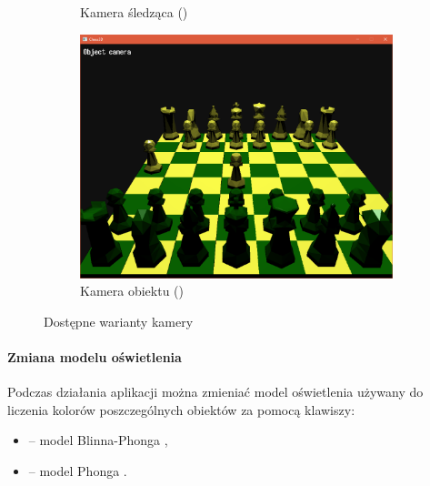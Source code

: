 \documentclass[10pt,a4paper]{article}
\begin{document}
\begin{figure}[H]
\begin{subfigure}[b]{0.3\textwidth}
		\caption{Kamera śledząca ()}
	\end{subfigure}
	\begin{subfigure}[b]{0.3\textwidth}
		\includegraphics[width=\textwidth]{screenshots/05_object.png}
		\caption{Kamera obiektu ()}
	\end{subfigure}
	\caption{Dostępne warianty kamery}
\end{figure}

\paragraph{Zmiana modelu oświetlenia}
Podczas działania aplikacji można zmieniać model oświetlenia używany do liczenia kolorów poszczególnych obiektów za pomocą klawiszy:
\begin{itemize}
	\item {} -- model Blinna-Phonga \cite{blinn77},
	\item {} -- model Phonga \cite{phong75}.
\end{itemize}
\end{document}
